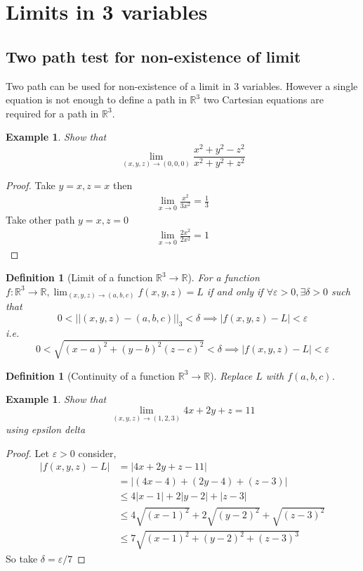 \documentclass[oneside,11pt,pdftex]{book}%
\numberwithin{equation}{section}
\newtheorem{example}[theorem]{Example}
\newtheorem{definition}[theorem]{Definition}
\numberwithin{section}{chapter}
\numberwithin{equation}{chapter}
\newcommand{\R}{\mathbb{R}}
\begin{document}
\section{Limits in 3 variables}
\subsection{Two path test for non-existence of limit}
Two path can be used for non-existence of a limit in 3 variables. However a single equation is not enough to define a path in $ \R^3 $ two Cartesian equations are required for a path in $ \R^3 $.

\begin{example}
	Show that \[ \lim_{(x,y,z)\rightarrow (0,0,0)} \frac{x^2+y^2-z^2}{x^2+y^2+z^2}\]
\end{example}
\begin{proof}
	Take $ y=x,z=x$ then 
	\begin{align*}
		\lim_{x \rightarrow 0} \frac{x^2}{3x^2}=\frac{1}{3}
	\end{align*}
	Take other path $ y=x,z=0 $
	\begin{align*}
		\lim_{x \rightarrow 0} \frac{2x^2}{2x^2}=1
	\end{align*}
\end{proof}

\begin{definition}[Limit of a function $ \R^3 \rightarrow \R  $]
	For a function $ f: \R^3 \rightarrow \R , \lim_{(x,y,z)\rightarrow (a,b,c)}f(x,y,z) =L $ if and only if $ \forall \varepsilon>0, \exists \delta >0  $ such that 
	\[ 0<||(x,y,z)-(a,b,c)||_3 < \delta \implies |f(x,y,z)-L|< \varepsilon\]
	i.e. \[ 0< \sqrt{(x-a)^2+(y-b)^2(z-c)^2}<\delta \implies |f(x,y,z)-L|<\varepsilon \]
\end{definition}

\begin{definition}[Continuity of a function $ \R^3 \rightarrow \R $]
Replace $ L $ with $ f(a,b,c) $.
\end{definition}

\begin{example}
	Show that \[ \lim_{(x,y,z) \rightarrow (1,2,3)} 4x+2y+z=11 \] using epsilon delta
\end{example}
\begin{proof}
	Let $ \varepsilon>0 $ consider,
	\begin{align*}
		|f(x,y,z)-L|&=|4x+2y+z-11|\\
		&= |(4x-4)+(2y-4)+(z-3)|\\
		&\leq 4|x-1|+2|y-2|+|z-3|\\
		& \leq 4 \sqrt{(x-1)^2}+2 \sqrt{(y-2)^2}+ \sqrt{(z-3)^2}\\
		&\leq 7 \sqrt{(x-1)^2 +(y-2)^2 +(z-3)^3}
	\end{align*}
So take $ \delta=\varepsilon/7 $
\end{proof}
\end{document}
